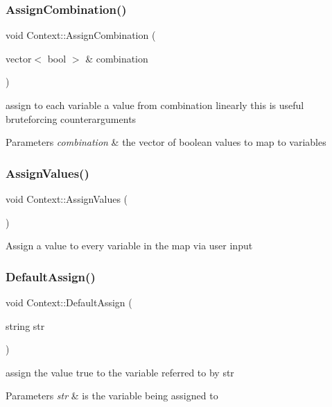 \subsubsection{\texorpdfstring{Assign\+Combination()}{AssignCombination()}}
{\footnotesize\ttfamily void Context\+::\+Assign\+Combination (\begin{DoxyParamCaption}\item[{vector$<$ bool $>$ \&}]{combination }\end{DoxyParamCaption})}

assign to each variable a value from combination linearly this is useful bruteforcing counterarguments 
\begin{DoxyParams}{Parameters}
{\em combination} & the vector of boolean values to map to variables \\
\hline
\end{DoxyParams}
\mbox{\label{classContext_a45f69da87ee7bc8843f6f99808e6686e}} 
\subsubsection{\texorpdfstring{Assign\+Values()}{AssignValues()}}
{\footnotesize\ttfamily void Context\+::\+Assign\+Values (\begin{DoxyParamCaption}{ }\end{DoxyParamCaption})}

Assign a value to every variable in the map via user input \mbox{\label{classContext_abbc623520a3b4ec31c55ade44fddc953}} 
\subsubsection{\texorpdfstring{Default\+Assign()}{DefaultAssign()}}
{\footnotesize\ttfamily void Context\+::\+Default\+Assign (\begin{DoxyParamCaption}\item[{string}]{str }\end{DoxyParamCaption})}

assign the value true to the variable referred to by str 
\begin{DoxyParams}{Parameters}
{\em str} & is the variable being assigned to \\
\hline
\end{DoxyParams}
\mbox{\label{classContext_ab61f6ccce5943b4aab6dac8cfdc9513c}} 
